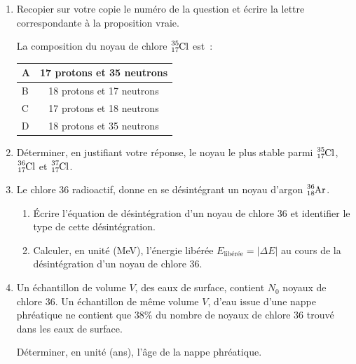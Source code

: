 \begin{enumerate}
    \item Recopier sur votre copie le numéro de la question et écrire la lettre
          correspondante à la proposition vraie.

          La composition du noyau de chlore $\ce{_{17}^{35}Cl}$ est~:

          \begin{minipage}{\linewidth}
              \begin{table}[H]
                  \centering
                  \setlength{\arrayrulewidth}{0.8pt}
                  \renewcommand{\arraystretch}{1.5}
                  \begin{tabularx}{\textwidth}{|p{1cm}|C|}
                      \hline
                      A & 17 protons et 35 neutrons \\
                      \hline
                      B & 18 protons et 17 neutrons \\
                      \hline
                      C & 17 protons et 18 neutrons \\
                      \hline
                      D & 18 protons et 35 neutrons \\
                      \hline
                  \end{tabularx}
              \end{table}
          \end{minipage}
    
    \item Déterminer, en justifiant votre réponse, le noyau le plus stable parmi
          $\ce{_{17}^{35}Cl}$, $\ce{_{17}^{36}Cl}$ et $\ce{_{17}^{37}Cl}$.

    \item Le chlore 36 radioactif, donne en se désintégrant un noyau d'argon
          $\ce{_{18}^{36}Ar}$.
          \begin{enumerate}
              \item Écrire l'équation de désintégration d'un noyau de chlore 36
                    et identifier le type de cette désintégration.
              \item Calculer, en unité (\unit{\MeV}), l'énergie libérée
                    $E_{\text{libérée}}=|\Delta E|$ au cours de la
                    désintégration d'un noyau de chlore 36.
          \end{enumerate}

    \item Un échantillon de volume $V$, des eaux de surface, contient $N_{0}$
          noyaux de chlore 36. Un échantillon de même volume $V$, d'eau issue
          d'une nappe phréatique ne contient que $38 \%$ du nombre de noyaux de
          chlore 36 trouvé dans les eaux de surface.
    
          Déterminer, en unité (ans), l'âge de la nappe phréatique.
\end{enumerate}

